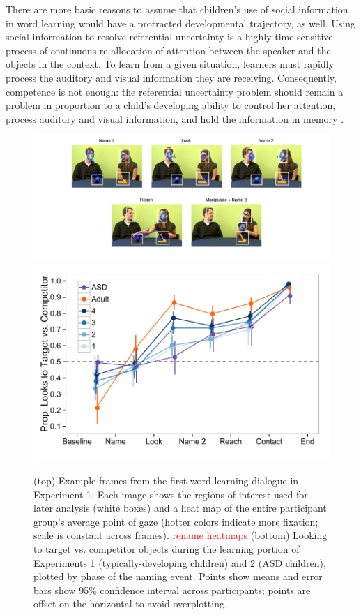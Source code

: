 \documentclass{pnastwo}
\newcommand{\red}[1]{\textcolor{red}{#1}}
\begin{document}
\begin{article}
There are more basic reasons to assume that children's use of social information in word learning would have a protracted developmental trajectory, as well. Using social information to resolve referential uncertainty is a highly time-sensitive process of continuous re-allocation of attention between the speaker and the objects in the context. To learn from a given situation, learners must rapidly process the auditory and visual information they are receiving. Consequently, competence is not enough: the referential uncertainty problem should remain a problem in proportion to a child's developing ability to control her attention, process auditory and visual information, and hold the information in memory \cite{dempster1981, kail1991, gathercole2004}. 

\begin{figure}
        \includegraphics[width=.45\textwidth]{figures/heatfigure.pdf}
        \includegraphics[width=.5\textwidth]{figures/reflook_learning.pdf}
	\caption{\label{fig:reflook_learning}  (top) Example frames from the first word learning dialogue in Experiment 1. Each image shows the regions of interest used for later analysis (white boxes) and a heat map of the entire participant group's average point of gaze (hotter colors indicate more fixation; scale is constant across frames). \red{rename heatmaps} (bottom) Looking to target vs. competitor objects during the learning portion of Experiments 1 (typically-developing children) and 2 (ASD children), plotted by phase of the naming event. Points show means and error bars show 95\% confidence interval across participants; points are offset on the horizontal to avoid overplotting.}
\end{figure}


\end{article}
\end{document}

